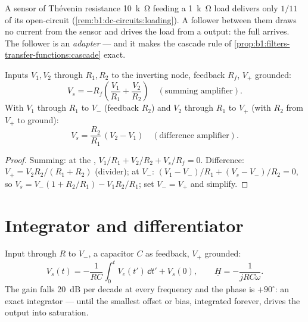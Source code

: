 \begin{example}\label{ex:b1:operational-amplifier:follower}
A sensor of Th\'evenin resistance \qty{10}{k\ohm} feeding a \qty{1}{k\ohm}
load delivers only $1/11$ of its open-circuit 
(\cref{rem:b1:dc-circuits:loading}). A follower between them draws no
current from the sensor and drives the load from a 
output: the full  arrives. The follower is an \emph{
adapter} --- and it makes the cascade rule of
\cref{prop:b1:filters-transfer-functions:cascade} exact.
\end{example}

\begin{proposition}\label{prop:b1:operational-amplifier:sumdiff}
Inputs $V_1, V_2$ through $R_1, R_2$ to the inverting node, feedback
$R_f$, $V_+$ grounded:
\[
V_s = -R_f\left(\frac{V_1}{R_1} + \frac{V_2}{R_2}\right)
\quad (\text{summing amplifier}).
\]
With $V_1$ through $R_1$ to $V_-$ (feedback $R_2$) and $V_2$ through
$R_1$ to $V_+$ (with $R_2$ from $V_+$ to ground):
\[
V_s = \frac{R_2}{R_1}\,(V_2 - V_1)
\quad (\text{difference amplifier}).
\]
\end{proposition}

\begin{proof}
Summing:  at the , $V_1/R_1 + V_2/R_2 + V_s/R_f =
0$. Difference: $V_+ = V_2R_2/(R_1 + R_2)$ (divider);  at $V_-$:
$(V_1 - V_-)/R_1 + (V_s - V_-)/R_2 = 0$, so $V_s = V_-(1 + R_2/R_1) -
V_1R_2/R_1$; set $V_- = V_+$ and simplify.
\end{proof}

\section{Integrator and differentiator}

\begin{proposition}[Integrator]\label{prop:b1:operational-amplifier:integrator}
Input through $R$ to $V_-$, a capacitor $C$ as feedback, $V_+$
grounded:
\[
V_s(t) = -\frac{1}{RC}\int_0^t V_e(t')\,\dd t' + V_s(0),
\qquad
\underline H = -\frac{1}{jRC\omega} .
\]
The gain falls \qty{20}{dB} per decade at every frequency and the phase
is $+90^\circ$: an exact integrator --- until the smallest offset or
bias, integrated forever, drives the output into saturation.
\end{proposition}

